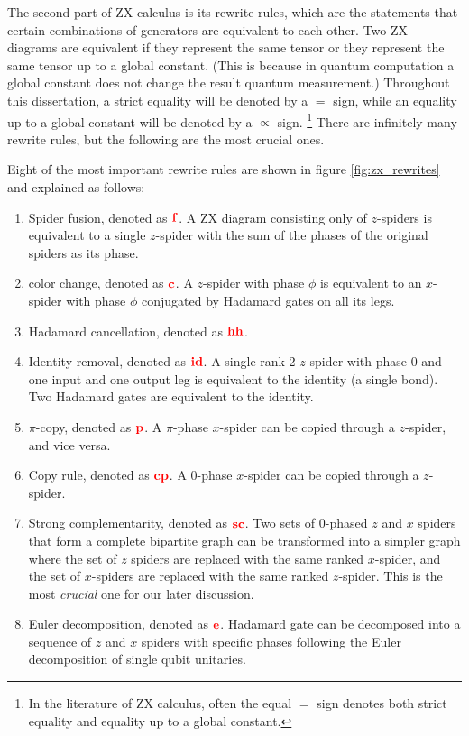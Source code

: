 The second part of ZX calculus is its rewrite rules,
which are the statements that certain combinations of generators are equivalent to each other.
Two ZX diagrams are equivalent if they represent the same tensor or they represent the same tensor up to a global constant. (This is because in quantum computation a global constant does not change the result quantum measurement.)
Throughout this dissertation, a strict equality will be denoted by a $=$ sign, while an equality up to a global constant will be denoted by a $\propto$ sign. \footnote{In the literature of ZX calculus, often the equal $=$ sign denotes both strict equality and equality up to a global constant.}
There are infinitely many rewrite rules, but the following are the most crucial ones.
\begin{definition}
	Eight of the most important rewrite rules are shown in figure \ref{fig:zx_rewrites} and explained as follows:
	\begin{enumerate}
	\item Spider fusion, denoted as $\color{red} \mathbf{f}$. 
		A ZX diagram consisting only of $z$-spiders is equivalent to a single $z$-spider with the sum of the phases of the original spiders as its phase.
	\item color change, denoted as $\color{red} \mathbf{c}$.
		A $z$-spider with phase $\phi$ is equivalent to an $x$-spider with phase $\phi$ conjugated by Hadamard gates on all its legs.
	\item Hadamard cancellation, denoted as $\color{red} \mathbf{hh}$.
	\item Identity removal, denoted as $\color{red} \mathbf{id}$.
		A single rank-2 $z$-spider with phase $0$ and one input and one output leg is equivalent to the identity (a single bond).
		Two Hadamard gates are equivalent to the identity.
	\item $\pi$-copy, denoted as $\color{red} \mathbf{p}$. A $\pi$-phase $x$-spider can be copied through a $z$-spider, and vice versa.
	\item Copy rule, denoted as $\color{red} \mathbf{cp}$. A $0$-phase $x$-spider can be copied through a $z$-spider.
	\item Strong complementarity, denoted as $\color{red} \mathbf{sc}$. 
		Two sets of 0-phased $z$ and $x$ spiders that form a complete bipartite graph can be transformed into a simpler graph where the set of $z$ spiders are replaced with the same ranked $x$-spider, and the set of $x$-spiders are replaced with the same ranked $z$-spider.
		This is the most \emph{crucial} one for our later discussion. 
	\item Euler decomposition, denoted as $\color{red} \mathbf{e}$. 
		Hadamard gate can be decomposed into a sequence of $z$ and $x$ spiders with specific phases following the Euler decomposition of single qubit unitaries.
\end{enumerate}


\end{definition}

